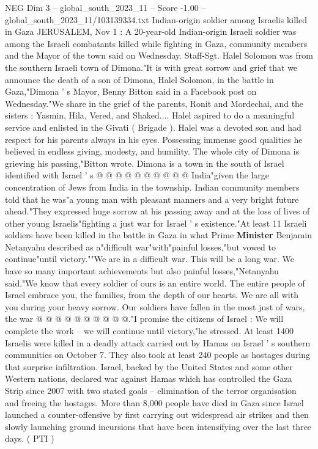 \begin{textsample}{NEG Dim 3 – global\_south\_2023\_11 – Score -1.00 – global\_south\_2023\_11/103139334.txt}  \label{ex:f3_neg_102}
Indian-origin soldier among Israelis killed in Gaza JERUSALEM, Nov 1 : A 20-year-old Indian-origin Israeli soldier was among the Israeli combatants killed while fighting in Gaza, community members and the Mayor of the town said on Wednesday.
Staff-Sgt.
Halel Solomon was from the southern Israeli town of Dimona."It is with great sorrow and grief that we announce the death of a son of Dimona, Halel Solomon, in the battle in Gaza,"Dimona ' s Mayor, Benny Bitton said in a Facebook post on Wednesday."We share in the grief of the parents, Ronit and Mordechai, and the sisters : Yasmin, Hila, Vered, and Shaked....
Halel aspired to do a meaningful service and enlisted in the Givati ( Brigade ).
Halel was a devoted son and had respect for his parents always in his eyes.
Possessing immense good qualities he believed in endless giving, modesty, and humility.
The whole city of Dimona is grieving his passing,"Bitton wrote.
Dimona is a town in the south of Israel identified with Israel ' s @ @ @ @ @ @ @ @ @ @ India"given the large concentration of Jews from India in the township.
Indian community members told that he was"a young man with pleasant manners and a very bright future ahead."They expressed huge sorrow at his passing away and at the loss of lives of other young Israelis"fighting a just war for Israel ' s existence."At least 11 Israeli soldiers have been killed in the battle in Gaza in what Prime \textbf{Minister} Benjamin Netanyahu described as a"difficult war"with"painful losses,"but vowed to continue"until victory.""We are in a difficult war.
This will be a long war.
We have so many important achievements but also painful losses,"Netanyahu said."We know that every soldier of ours is an entire world.
The entire people of Israel embrace you, the families, from the depth of our hearts.
We are all with you during your heavy sorrow.
Our soldiers have fallen in the most just of wars, the war @ @ @ @ @ @ @ @ @ @."I promise the citizens of Israel : We will complete the work -- we will continue until victory,"he stressed.
At least 1400 Israelis were killed in a deadly attack carried out by Hamas on Israel ' s southern communities on October 7.
They also took at least 240 people as hostages during that surprise infiltration.
Israel, backed by the United States and some other Western nations, declared war against Hamas which has controlled the Gaza Strip since 2007 with two stated goals -- elimination of the terror organisation and freeing the hostages.
More than 8,000 people have died in Gaza since Israel launched a counter-offensive by first carrying out widespread air strikes and then slowly launching ground incursions that have been intensifying over the last three days. ( PTI )

\end{textsample}

